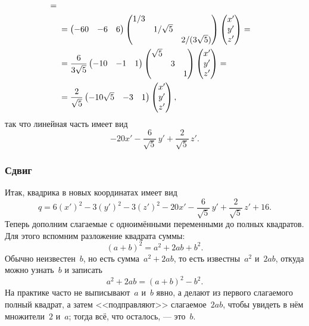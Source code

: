 \begin{solution}
\begin{align*}
{		}
		= {} \\ {} &=
		\begin{pmatrix}
			-60 & -6 & 6
		\end{pmatrix}
		\begin{pmatrix}
			1/3 \\
			& 1/\sqrt{5} \\
			&& 2/(3\sqrt{5})
		\end{pmatrix}
		\begin{pmatrix}
			x' \\ y' \\ z'
		\end{pmatrix}
		= {} \\ {} &=
		\frac{6}{3\sqrt{5}}
		\begin{pmatrix}
			-10 & -1 & 1
		\end{pmatrix}
		\begin{pmatrix}
			\sqrt{5} \\
			& 3 \\
			&& 1
		\end{pmatrix}
		\begin{pmatrix}
			x' \\ y' \\ z'
		\end{pmatrix}
		= {} \\ {} &=
		\frac{2}{\sqrt{5}}
		\begin{pmatrix}
			-10\sqrt{5} & -3 & 1
		\end{pmatrix}
		\begin{pmatrix}
			x' \\ y' \\ z'
		\end{pmatrix}
		,
	\end{align*}
	так что линейная часть имеет вид
	\[
		-20 x' - \frac{6}{\sqrt{5}}\,y' + \frac{2}{\sqrt{5}}\,z'
		.
	\]

	\subsubsection{Сдвиг}

	Итак, квадрика в новых координатах имеет вид
	\begin{equation}
		q =
		6(x')^2 - 3(y')^2 - 3(z')^2
		-20 x' - \frac{6}{\sqrt{5}}\,y' + \frac{2}{\sqrt{5}}\,z'
		+ 16
		.
		\label{eq:num_09:q:x':full}
	\end{equation}
	Теперь дополним слагаемые с одноимёнными переменными до полных квадратов. Для этого вспомним разложение квадрата суммы:
	\[
		(a + b)^2 = a^2 + 2ab + b^2
		.
	\]
	Обычно неизвестен~$b$, но есть сумма~$a^2 + 2ab$, то есть известны~$a^2$ и~$2ab$, откуда можно узнать~$b$ и записать
	\[
		a^2 + 2ab = (a + b)^2 - b^2
		.
	\]
	На практике часто не выписывают~$a$ и~$b$ явно, а делают из первого слагаемого полный квадрат, а затем <<подправляют>> слагаемое~$2ab$, чтобы увидеть в нём множители~$2$ и~$a$; тогда всё, что осталось, --- это~$b$.


\end{solution}
